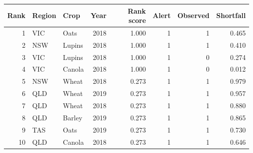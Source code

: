 \begin{tabular}{rllrrrrr}
\toprule
Rank & Region & Crop & Year & Rank score & Alert & Observed & Shortfall \\
\midrule
1 & VIC & Oats & 2018 & 1.000 & 1 & 1 & 0.465 \\
2 & NSW & Lupins & 2018 & 1.000 & 1 & 1 & 0.410 \\
3 & VIC & Lupins & 2018 & 1.000 & 1 & 0 & 0.274 \\
4 & VIC & Canola & 2018 & 1.000 & 1 & 0 & 0.012 \\
5 & NSW & Wheat & 2018 & 0.273 & 1 & 1 & 0.979 \\
6 & QLD & Wheat & 2019 & 0.273 & 1 & 1 & 0.957 \\
7 & QLD & Wheat & 2018 & 0.273 & 1 & 1 & 0.880 \\
8 & QLD & Barley & 2019 & 0.273 & 1 & 1 & 0.865 \\
9 & TAS & Oats & 2019 & 0.273 & 1 & 1 & 0.730 \\
10 & QLD & Canola & 2018 & 0.273 & 1 & 1 & 0.646 \\
\bottomrule
\end{tabular}
